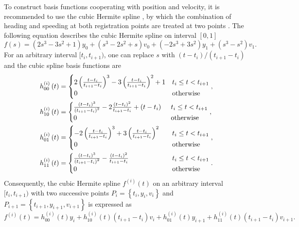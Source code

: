 To construct basis functions cooperating with position and velocity, it is recommended to use the cubic Hermite spline \citep{Hermite1863Remarque}, by which the combination of heading and speeding at both registration points are treated at two points \citep{hintzen2010improved}. The following equation describes the cubic Hermite spline on interval $[0,1]$
\begin{equation*}
f(s)=\left(2s^3-3s^2+1\right)y_0+\left(s^3-2s^2+s\right)v_0+\left(-2s^3+3s^2\right)y_1+\left(s^3-s^2\right)v_1.
\end{equation*}
For an arbitrary interval $[t_i, t_{i+1})$, one can replace $s$ with $(t-t_i)/(t_{i+1}-t_i)$ and the cubic spline basis functions are 
\begin{align}\label{hermitebasis1}
& h_{00}^{\left(i\right)}\left(t\right)=
\begin{cases}
2\left(\frac{t-t_{i}}{t_{i+1}-t_{i}}\right)^3-3\left(\frac{t-t_{i}}{t_{i+1}-t_{i}}\right)^2+1 & t_i\leq t<t_{i+1} \\ 
0 & \mbox{otherwise}
\end{cases}, \\
& h_{10}^{\left(i\right)}\left(t\right)=\begin{cases}
\frac{\left(t-t_{i}\right)^3}{\left(t_{i+1}-t_{i}\right)^2}-2\frac{\left(t-t_{i}\right)^2}{t_{i+1}-t_{i}}+\left(t-t_{i}\right)  \hphantom{.}  & t_i\leq t<t_{i+1} \\ 
0 &   \mbox{otherwise}
\end{cases},\\
& h_{01}^{\left(i\right)}\left(t\right)=
\begin{cases}
-2\left(\frac{t-t_i}{t_{i+1}-t_i}\right)^3+3\left(\frac{t-t_i}{t_{i+1}-t_i}\right)^2 \hphantom{+} & t_i\leq t<t_{i+1} \\ 
0 &   \mbox{otherwise}
\end{cases},\\
& h_{11}^{\left(i\right)}\left(t\right)=\begin{cases}
\frac{\left(t-t_i\right)^3}{\left(t_{i+1}-t_i\right)^2}-\frac{\left(t-t_i\right)^2}{t_{i+1}-t_i}  \hphantom{+t-+123-}  & t_i\leq t<t_{i+1} \\ 
0 &   \mbox{otherwise}
\end{cases}.
\end{align}
Consequently, the cubic Hermite spline $f^{(i)}(t)$ on an arbitrary interval $[t_i,t_{i+1})$ with two successive points $P_i=\left\lbrace t_i, y_i,v_i\right\rbrace$ and $P_{i+1}=\left\lbrace t_{i+1}, y_{i+1},v_{i+1} \right\rbrace$ is expressed as
\begin{equation}\label{cubicHermitesplineform}
f^{(i)}(t)=h_{00}^{(i)}(t)y_i+h_{10}^{(i)}(t) \left(t_{i+1}-t_i\right)  v_i+h_{01}^{(i)}(t)y_{i+1} +h_{11}^{(i)}(t)\left(t_{i+1}-t_i\right) v_{i+1}.
\end{equation}

